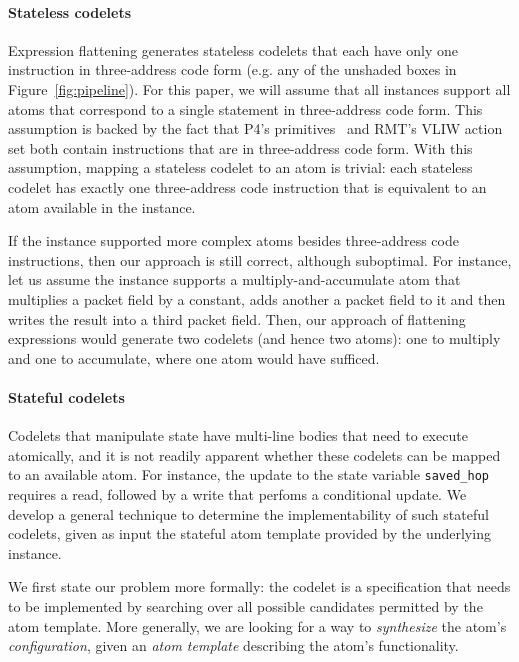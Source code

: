 \paragraph{Stateless codelets}
Expression flattening generates stateless codelets that each have only one
instruction in three-address code form (e.g. any of the unshaded boxes in
Figure~\ref{fig:pipeline}). For this paper, we will assume that all \absmachine
instances support all atoms that correspond to a single statement in
three-address code form. This assumption is backed by the fact that P4's
primitives~\cite{p4spec} and RMT's VLIW action set both contain instructions
that are in three-address code form. With this assumption, mapping a stateless
codelet to an atom is trivial: each stateless codelet has exactly one
three-address code instruction that is equivalent to an atom available in the
\absmachine instance.

If the \absmachine instance supported more complex atoms besides three-address
code instructions, then our approach is still correct, although suboptimal. For
instance, let us assume the \absmachine instance supports a
multiply-and-accumulate atom that multiplies a packet field by a constant, adds
another a packet field to it and then writes the result into a third packet
field. Then, our approach of flattening expressions would generate two codelets
(and hence two atoms): one to multiply and one to accumulate, where one atom
would have sufficed.

\paragraph{Stateful codelets}
Codelets that manipulate state have multi-line bodies that need to execute
atomically, and it is not readily apparent whether these codelets can be mapped
to an available atom. For instance, the update to the state variable
\texttt{saved\_hop} requires a read, followed by a write that perfoms a
conditional update. We develop a general technique to determine the
implementability of such stateful codelets, given as input the stateful atom
template provided by the underlying \absmachine instance.

We first state our problem more formally: the codelet is a specification that
needs to be implemented by searching over all possible candidates permitted by
the atom template.  More generally, we are looking for a way to
\textit{synthesize} the atom's \textit{configuration}, given an \textit{atom
template} describing the atom's functionality.

